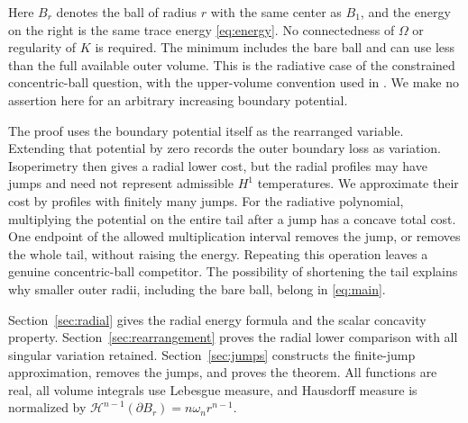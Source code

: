 Here \(B_r\) denotes the ball of radius \(r\) with the same center as
\(B_1\), and the energy on the right is the same trace energy
\eqref{eq:energy}. No connectedness of \(\Omega\) or regularity of
\(K\) is required. The minimum includes the bare ball and can use
less than the full available outer volume. This is the radiative
case of the constrained concentric-ball question, with the
upper-volume convention used in \cite{BNNT}.
We make no assertion here for an arbitrary increasing boundary potential.

The proof uses the boundary potential itself as the rearranged
variable. Extending that potential by zero records the outer
boundary loss as variation. Isoperimetry then gives a radial lower
cost, but the radial profiles may have jumps and need not represent
admissible \(H^1\) temperatures. We approximate their cost by profiles
with finitely many jumps. For the radiative polynomial, multiplying
the potential on the entire tail after a jump has a concave total
cost. One endpoint of the allowed multiplication interval removes
the jump, or removes the whole tail, without raising the energy.
Repeating this operation leaves a genuine concentric-ball competitor.
The possibility of shortening the tail explains why smaller outer
radii, including the bare ball, belong in \eqref{eq:main}.

Section~\ref{sec:radial} gives the radial energy formula and the scalar
concavity property. Section~\ref{sec:rearrangement} proves the radial
lower comparison with all singular variation retained.
Section~\ref{sec:jumps} constructs the finite-jump approximation,
removes the jumps, and proves the theorem.
All functions are real, all volume integrals use Lebesgue measure,
and Hausdorff measure is normalized by
\(\mathcal H^{n-1}(\partial B_r)=n\omega_n r^{n-1}\).
